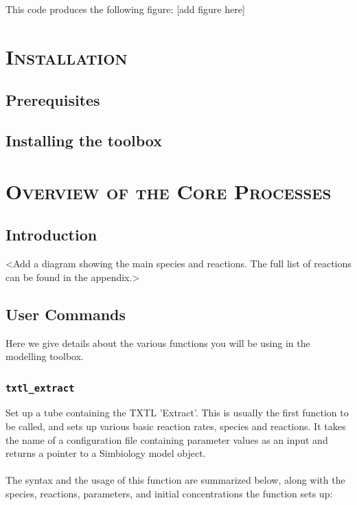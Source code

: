 \documentclass[english]{report}
\begin{document}
\noindent This code produces the following figure: [add figure here]


\chapter{\textsc{Installation}}
	\section{Prerequisites}
	\section{Installing the toolbox}
	
\chapter{\textsc{Overview of the Core Processes}} %
	\section{Introduction}
	<Add a diagram showing the main species and reactions. The full list of reactions can be found in the appendix.>
	\section{User Commands}	
	Here we give details about the various functions you will be using in the modelling toolbox. 	

		\subsection*{\texttt{txtl\_extract}}
			Set up a tube containing the TXTL 'Extract'. This is usually the first function to be called, and sets up various basic reaction rates, species and reactions. It takes the name of a configuration file containing parameter values as an input and returns a pointer to a Simbiology model object.  \\	
			\\
			The syntax and the usage of this function are summarized below, along with the species, reactions, parameters, and initial concentrations the function sets up:
			
\end{document}
